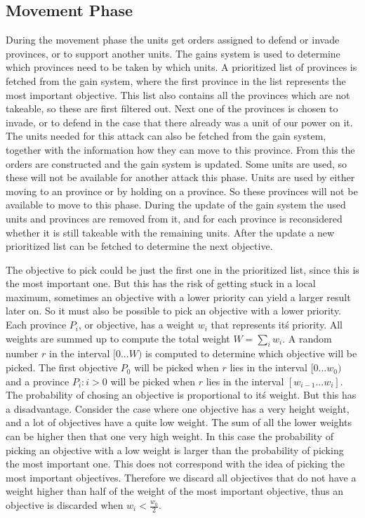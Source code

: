 \documentclass[a4paper]{article} %
\begin{document}
\subsection{Movement Phase} 

During the movement phase the units get orders assigned to defend or invade provinces, or to support another units. The gains system is used to determine which provinces need to be taken by which units. A prioritized list of provinces is fetched from the gain system, where the first province in the list represents the most important objective. This list also contains all the provinces which are not takeable, so these are first filtered out. Next one of the provinces is chosen to invade, or to defend in the case that there already was a unit of our power on it. The units needed for this attack can also be fetched from the gain system, together with the information how they can move to this province. From this the orders are constructed and the gain system is updated. Some units are used, so these will not be available for another attack this phase. Units are used by either moving to an province or by holding on a province. So these provinces will not be available to move to this phase. During the update of the gain system the used units and provinces are removed from it, and for each province is reconsidered whether it is still takeable with the remaining units. After the update a new prioritized list can be fetched to determine the next objective. 

The objective to pick could be just the first one in the prioritized list, since this is the most important one. But this has the risk of getting stuck in a local maximum, sometimes an objective with a lower priority can yield a larger result later on. So it must also be possible to pick an objective with a lower priority. Each province $P_{i}$, or objective, has a weight $w_{i}$ that represents it\'s priority. All weights are summed up to compute the total weight $W=\sum_{i}w_{i}$. A random number $r$ in the interval $[0...W)$ is computed to determine which objective will be picked. The first objective $P_{0}$ will be picked when $r$ lies in the interval $[0...w_{0})$ and a province $P_{i}:i>0$ will be picked when $r$ lies in the interval $[w_{i-1}...w_{i}]$. The probability of chosing an objective is proportional to it\'s weight. But this has a disadvantage. Consider the case where one objective has a very height weight, and a lot of objectives have a quite low weight. The sum of all the lower weights can be higher then that one very high weight. In this case the probability of picking an objective with a low weight is larger than the probability of picking the most important one. This does not correspond with the idea of picking the most important objectives. Therefore we discard all objectives that do not have a weight higher than half of the weight of the most important objective, thus an objective is discarded when $w_{i} < \frac{w_{0}}{2}$.
\end{document}
